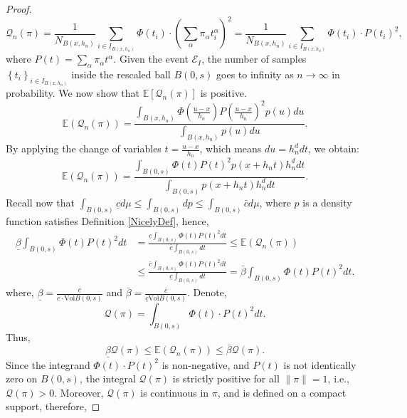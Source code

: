 \documentclass{article}
\begin{document}
\begin{proof}
$$
\mathcal{Q}_n(\pi)=\frac{1}{N_{B\left(x, h_n\right)}} \sum_{i \in I_{B\left(x, h_n\right)}} \Phi\left(t_i\right) \cdot\left(\sum_\alpha \pi_\alpha t_i^\alpha\right)^2=\frac{1}{N_{B\left(x, h_n\right)}} \sum_{i \in I_{B\left(x, h_n\right)}} \Phi\left(t_i\right) \cdot P\left(t_i\right)^2,
$$
where $P(t)=\sum_\alpha \pi_\alpha t^\alpha$.
Given the event $\mathscr{E}_I$, the number of samples $\left\{t_i\right\}_{i \in I_{B\left(x, h_n\right)}}$ inside the rescaled ball $B(0, s)$ goes to infinity  as $n \rightarrow \infty$ in probability.  We now show that 
$\mathbb{E}\left[\mathcal{Q}_n(\pi)\right]$ is positive.
$$
\mathbb{E}\left(\mathcal{Q}_n(\pi)\right)=\frac{\int_{B\left(x, h_n\right)} \Phi\left(\frac{u-x}{h_n}\right) P\left(\frac{u-x}{h_n}\right)^2 p(u) d u}{\int_{B\left(x, h_n\right)} p(u) d u}.
$$
By applying the change of variables $t=\frac{u-x}{h_n}$, which means $d u=h_n^d d t$, we obtain:
$$
\mathbb{E}(\mathcal{Q}_n(\pi))=\frac{\int_{B(0, s)} \Phi(t) P(t)^2 p\left(x+h_n t\right) h_n^d d t}{\int_{B(0, s)} p\left(x+h_n t\right) h_n^d d t}.
$$
Recall now that $\int_{B(0,s)} \underline{c} d \mu \leq \int_{B(0,s)} d p \leq\int_{B(0,s)} \bar{c} d \mu$, where $p$ is a density function satisfies Definition \ref{NicelyDef}, hence,
\begin{equation}
\begin{aligned}
    \underline{\beta} \int_{B(0, s)} \Phi(t) P(t)^2 dt 
    &= \frac{\underline{c}\int_{B(0, s)} \Phi(t) P(t)^2 d t}{\bar{c}\int_{B(0, s)} d t} 
    \leq \mathbb{E}(\mathcal{Q}_n(\pi)) \\
    &\leq \frac{\bar{c}\int_{B(0, s)} \Phi(t) P(t)^2 d t}{\underline{c}\int_{B(0, s)} d t} 
    = \bar{\beta} \int_{B(0, s)} \Phi(t) P(t)^2 dt.
\end{aligned}
\end{equation}
where, $\underline{\beta}= \frac{\underline{c}}{\bar{c}\cdot \text{Vol}B(0,s)} $ and $\bar{\beta}=\frac{\bar{c}}{\underline{c}\text{Vol}B(0,s)} $. Denote,
$$
\mathcal{Q}(\pi)=\int_{B(0, s)} \Phi(t) \cdot P(t)^2 dt.
$$
Thus,
\begin{equation}
    \underline{\beta} \mathcal{Q}(\pi) \leq \mathbb{E}(\mathcal{Q}_n(\pi))\leq
\bar{\beta} \mathcal{Q}(\pi).
\label{bound of EQ_n}
\end{equation}
Since the integrand $\Phi(t) \cdot P(t)^2 $ is non-negative, and $P(t) $ is not identically zero on $ B(0,s)$, the integral $\mathcal{Q}(\pi) $ is strictly positive for all $\|\pi\|=1 $, i.e., $\mathcal{Q}(\pi)>0$.
Moreover, $\mathcal{Q}(\pi)$ is continuous in $\pi$, and is defined on a compact support, therefore,

\end{proof}
\end{document}
